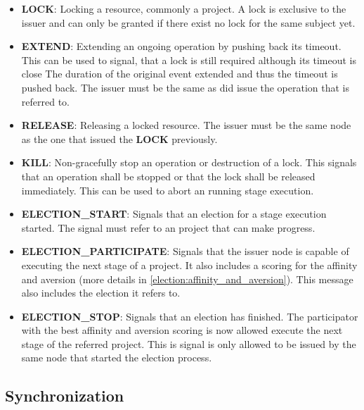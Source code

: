 \begin{itemize}
	\item \textbf{LOCK}: Locking a resource, commonly a project.
	A lock is exclusive to the issuer and can only be granted if there exist no lock for the same subject yet.
	\item \textbf{EXTEND}: Extending an ongoing operation by pushing back its timeout.
	This can be used to signal, that a lock is still required although its timeout is close
	The duration of the original event extended and thus the timeout is pushed back.
	The issuer must be the same as did issue the operation that is referred to.
	\item \textbf{RELEASE}: Releasing a locked resource.
	The issuer must be the same node as the one that issued the \textbf{LOCK} previously.
	\item \textbf{KILL}: Non-gracefully stop an operation or destruction of a lock.
	This signals that an operation shall be stopped or that the lock shall be released immediately.
	This can be used to abort an running stage execution.
	\item \textbf{ELECTION\_START}: Signals that an election for a stage execution started.
	The signal must refer to an project that can make progress.
	\item \textbf{ELECTION\_PARTICIPATE}: Signals that the issuer node is capable of executing the next stage of a project.
	It also includes a scoring for the affinity and aversion (more details in \autoref{election:affinity_and_aversion}).
	This message also includes the election it refers to.
	\item \textbf{ELECTION\_STOP}: Signals that an election has finished.
	The participator with the best affinity and aversion scoring is now allowed execute the next stage of the referred project.
	This is signal is only allowed to be issued by the same node that started the election process.
\end{itemize}

\subsection{Synchronization}

